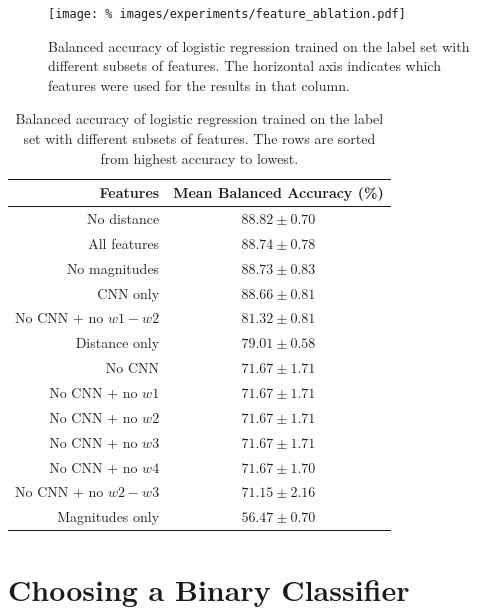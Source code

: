     \begin{figure}[!ht]
      \centering
      \texttt{[image: \%
        images/experiments/feature\_ablation.pdf]}
      \caption{Balanced accuracy of logistic regression trained on the
        \citeauthor{norris06} label set with different subsets of features. The
        horizontal axis indicates which features were used for the results in
        that column.}
      \label{fig:feature-ablation}
    \end{figure}

    \begin{table}[!ht]
      \centering
      \begin{tabular}{r|c}
        \textbf{Features} & \textbf{Mean Balanced Accuracy (\%)}\\\hline
        No distance & $88.82 \pm 0.70$\\
        All features & $88.74 \pm 0.78$\\
        No magnitudes & $88.73 \pm 0.83$\\
        CNN only & $88.66 \pm 0.81$\\
        No CNN + no $w1 - w2$ & $81.32 \pm 0.81$\\
        Distance only & $79.01 \pm 0.58$\\
        No CNN & $71.67 \pm 1.71$\\
        No CNN + no $w1$ & $71.67 \pm 1.71$\\
        No CNN + no $w2$ & $71.67 \pm 1.71$\\
        No CNN + no $w3$ & $71.67 \pm 1.71$\\
        No CNN + no $w4$ & $71.67 \pm 1.70$\\
        No CNN + no $w2 - w3$ & $71.15 \pm 2.16$\\
        Magnitudes only & $56.47 \pm 0.70$\\
      \end{tabular}
      \caption{Balanced accuracy of logistic regression trained on the
        \citeauthor{norris06} label set with different subsets of features. The
        rows are sorted from highest accuracy to lowest.}
      \label{tab:feature-ablation}
    \end{table}

\section{Choosing a Binary Classifier}
\label{sec:binary-classifiers}
  
